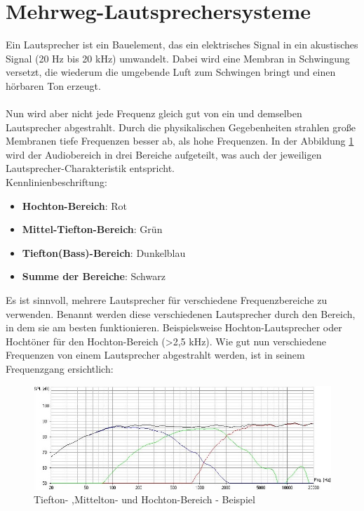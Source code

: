 \section{Mehrweg-Lautsprechersysteme}\label{sec:3.2}
Ein Lautsprecher ist ein Bauelement, das ein elektrisches Signal in ein akustisches Signal (20 Hz bis 20 kHz) umwandelt.
Dabei wird eine Membran in Schwingung versetzt, die wiederum die umgebende Luft zum Schwingen bringt und einen hörbaren Ton erzeugt.
\\ \\
Nun wird aber nicht jede Frequenz gleich gut von ein und demselben Lautsprecher abgestrahlt.
Durch die physikalischen Gegebenheiten strahlen große Membranen tiefe Frequenzen besser ab, als hohe Frequenzen.
In der Abbildung \ref{fig:3.2.1} wird der Audiobereich in drei Bereiche aufgeteilt, was auch der jeweiligen Lautsprecher-Charakteristik entspricht.\\
Kennlinienbeschriftung:\\
\begin{itemize}
	\item \textbf{Hochton-Bereich}: Rot
	\item \textbf{Mittel-Tiefton-Bereich}: Grün
	\item \textbf{Tiefton(Bass)-Bereich}: Dunkelblau
	\item \textbf{Summe der Bereiche}: Schwarz	
\end{itemize}
Es ist sinnvoll, mehrere Lautsprecher für verschiedene Frequenzbereiche zu verwenden.
Benannt werden diese verschiedenen Lautsprecher durch den Bereich, in dem sie am besten funktionieren.
Beispielsweise Hochton-Lautsprecher oder Hochtöner für den Hochton-Bereich (>2,5 kHz).
Wie gut nun verschiedene Frequenzen von einem Lautsprecher abgestrahlt werden, ist in seinem Frequenzgang ersichtlich:
\begin{figure} [H]
	\centering
	\includegraphics[width=1\textwidth]{img/Grundlagen/Mehrweg-Lautsprechersysteme/Frequenzbereiche-Audio-cut.jpg}
	\caption{Tiefton- ,Mittelton- und Hochton-Bereich - Beispiel}
	\label{fig:3.2.1}
\end{figure}

